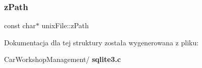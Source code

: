 \mbox{\label{structunix_file_afc5eff0948d553308cf90a79d4a06f17}} 
\subsubsection{zPath}
{\footnotesize\ttfamily const char$\ast$ unix\+File\+::z\+Path}



Dokumentacja dla tej struktury została wygenerowana z pliku\+:\begin{DoxyCompactItemize}
\item 
Car\+Workshop\+Management/\textbf{ sqlite3.\+c}\end{DoxyCompactItemize}
